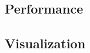 \subsection{Performance}\label{subsec:performance}

\subsection{Visualization}\label{subsec:visualization}



